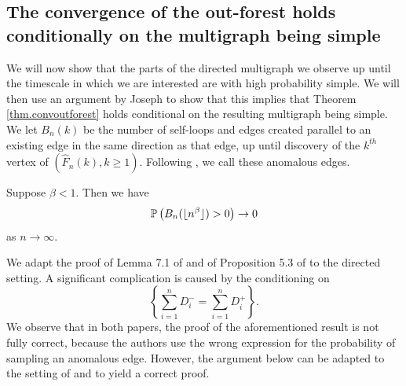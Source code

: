\subsection{The convergence of the out-forest holds conditionally on the multigraph being simple}
We will now show that the parts of the directed multigraph we observe up until the timescale in which we are interested are with high probability simple. We will then use an argument by Joseph \cite{josephComponentSizesCritical2014} to show that this implies that Theorem \ref{thm.convoutforest} holds conditional on the resulting multigraph being simple. We let $B_n(k)$ be the number of self-loops and edges created parallel to an existing edge in the same direction as that edge, up until discovery of the $k^{th}$ vertex of $(\hat{F}_n(k),k\geq 1)$. Following \cite{conchon--kerjanStableGraphMetric2020}, we call these anomalous edges. 
\begin{proposition}\label{prop.anomalousedges}
Suppose $\beta<1$. Then we have
$$\P\left(B_n(\lfloor n^\beta \rfloor)>0\right)\to 0$$
as $n\to \infty$.
\end{proposition}
\begin{remark}
We adapt the proof of Lemma 7.1 of \cite{josephComponentSizesCritical2014} and of Proposition 5.3 of \cite{conchon--kerjanStableGraphMetric2020} to the directed setting. A significant complication is caused by the conditioning on $$\left\{\sum_{i=1}^n D^-_i=\sum_{i=1}^n D^+_i\right\}.$$ We observe that in both papers, the proof of the aforementioned result is not fully correct, because the authors use the wrong expression for the probability of sampling an anomalous edge. However, the argument below can be adapted to the setting of \cite{josephComponentSizesCritical2014} and \cite{conchon--kerjanStableGraphMetric2020} to yield a correct proof.
\end{remark}
